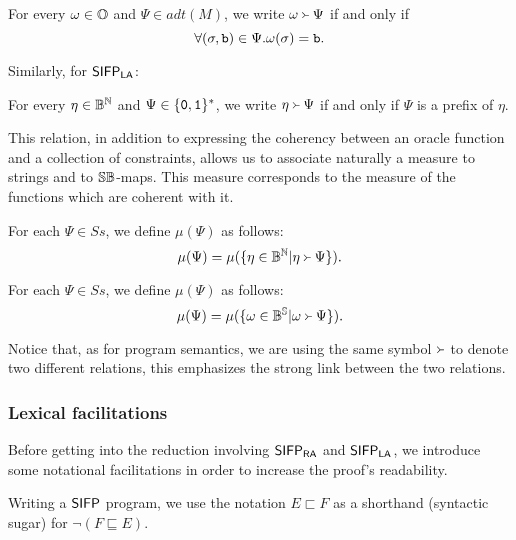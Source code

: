 \begin{defn}
  \label{def:sifpracoherency}
  For every $\omega \in \mathbb{O}$ and $\Psi \in \mathit{adt}(M)$, we write
    $\omega \Yright \Psi$ if and only if
  $$
    \forall (\sigma, \mathtt{b}) \in \Psi. \omega(\sigma)=\mathtt{b}.
  $$
\end{defn}
\noindent
Similarly, for $\mathsf{SIFP_{{\mathsf{LA}}}}$:

\begin{defn}
  \label{def:sifplacoherency}
  For every $\eta \in\mathbb{B}^{\mathbb{N}}$ and $\Psi \in \{\mathtt{0}, \mathtt{1}\}^*$, we write
    $\eta \Yright \Psi$ if and only if $\Psi$ is a prefix of $\eta$.
\end{defn}
\noindent
This relation, in addition to expressing the coherency between an oracle function
and a collection of constraints, allows us to associate naturally a measure to
strings and to $\mathbb{S}\mathbb{B}$-maps. This measure corresponds to the measure of
the functions which are coherent with it.

\begin{defn}
  \label{def:strmeasure}
  For each $\Psi \in Ss$, we define $\mu(\Psi)$ as follows:
  $$
  \mu(\Psi)=\mu(\{\eta \in \mathbb{B}^{\mathbb{N}}| \eta\Yright\Psi\}).
  $$
\end{defn}

\begin{defn}
  \label{def:mapmeasure}
  For each $\Psi \in Ss$, we define $\mu(\Psi)$ as follows:
  $$
  \mu(\Psi)=\mu(\{\omega \in \mathbb{B}^{\mathbb{S}}| \omega \Yright \Psi\}).
  $$
\end{defn}

Notice that, as for program semantics, we are using the same symbol $\Yright$ to denote
two different relations, this emphasizes the strong link between the two relations.


\subsubsection{Lexical facilitations}


Before getting into the reduction involving $\mathsf{SIFP_{{\mathsf{RA}}}}$ and $\mathsf{SIFP_{{\mathsf{LA}}}}$,
we introduce some notational facilitations in order to increase
the proof's readability.

\begin{notation}
Writing a $\mathsf{SIFP}$ program, we use the notation $E \sqsubset F$
as a shorthand (syntactic sugar) for $\lnot (F \sqsubseteq E)$.
\end{notation}

